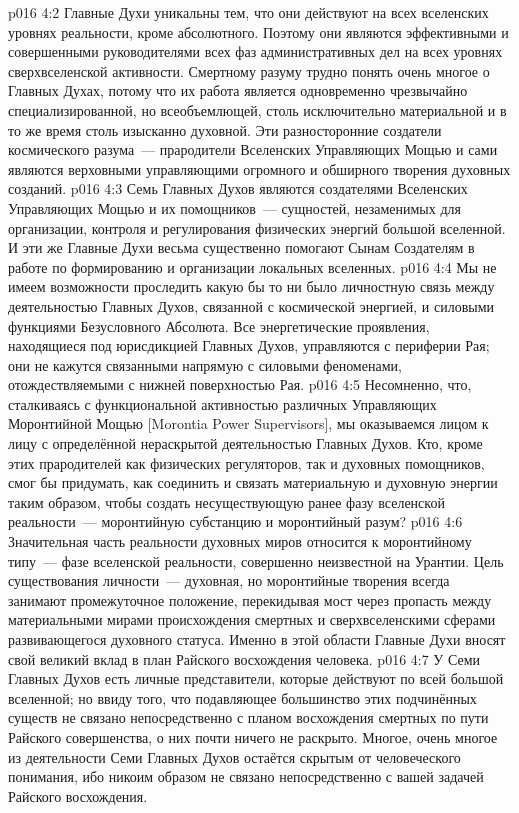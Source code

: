 \vs p016 4:2 Главные Духи уникальны тем, что они действуют на всех вселенских уровнях реальности, кроме абсолютного. Поэтому они являются эффективными и совершенными руководителями всех фаз административных дел на всех уровнях сверхвселенской активности. Смертному разуму трудно понять очень многое о Главных Духах, потому что их работа является одновременно чрезвычайно специализированной, но всеобъемлющей, столь исключительно материальной и в то же время столь изысканно духовной. Эти разносторонние создатели космического разума~--- прародители Вселенских Управляющих Мощью и сами являются верховными управляющими огромного и обширного творения духовных созданий.
\vs p016 4:3 Семь Главных Духов являются создателями Вселенских Управляющих Мощью и их помощников~--- сущностей, незаменимых для организации, контроля и регулирования физических энергий большой вселенной. И эти же Главные Духи весьма существенно помогают Сынам Создателям в работе по формированию и организации локальных вселенных.
\vs p016 4:4 Мы не имеем возможности проследить какую бы то ни было личностную связь между деятельностью Главных Духов, связанной с космической энергией, и силовыми функциями Безусловного Абсолюта. Все энергетические проявления, находящиеся под юрисдикцией Главных Духов, управляются с периферии Рая; они не кажутся связанными напрямую с силовыми феноменами, отождествляемыми с нижней поверхностью Рая.
\vs p016 4:5 Несомненно, что, сталкиваясь с функциональной активностью различных Управляющих Моронтийной Мощью [Morontia Power Supervisors], мы оказываемся лицом к лицу с определённой нераскрытой деятельностью Главных Духов. Кто, кроме этих прародителей как физических регуляторов, так и духовных помощников, смог бы придумать, как соединить и связать материальную и духовную энергии таким образом, чтобы создать несуществующую ранее фазу вселенской реальности~--- моронтийную субстанцию и моронтийный разум?
\vs p016 4:6 Значительная часть реальности духовных миров относится к моронтийному типу~--- фазе вселенской реальности, совершенно неизвестной на Урантии. Цель существования личности~--- духовная, но моронтийные творения всегда занимают промежуточное положение, перекидывая мост через пропасть между материальными мирами происхождения смертных и сверхвселенскими сферами развивающегося духовного статуса. Именно в этой области Главные Духи вносят свой великий вклад в план Райского восхождения человека.
\vs p016 4:7 У Семи Главных Духов есть личные представители, которые действуют по всей большой вселенной; но ввиду того, что подавляющее большинство этих подчинённых существ не связано непосредственно с планом восхождения смертных по пути Райского совершенства, о них почти ничего не раскрыто. Многое, очень многое из деятельности Семи Главных Духов остаётся скрытым от человеческого понимания, ибо никоим образом не связано непосредственно с вашей задачей Райского восхождения.
